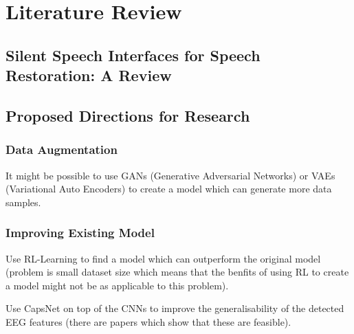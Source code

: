 \chapter{Literature Review} \label{chap:lit-review}

\section{Silent Speech Interfaces for Speech Restoration: A Review}



\section{Proposed Directions for Research}

\subsection{Data Augmentation}

It might be possible to use GANs (Generative Adversarial Networks) or
VAEs (Variational Auto Encoders) to create a model which can generate
more data samples.

\subsection{Improving Existing Model}

Use RL-Learning to find a model which can outperform the original model
(problem is small dataset size which means that the benfits of using RL
to create a model might not be as applicable to this problem).

Use CapsNet on top of the CNNs to improve the generalisability of the
detected EEG features (there are papers which show that these are
feasible).